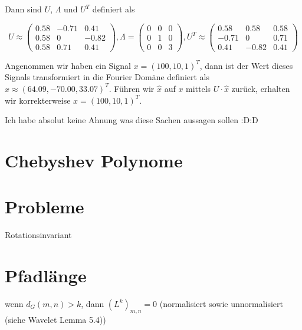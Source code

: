 Dann sind $U$, $\Lambda$ und $U^T$ definiert als

\begin{equation}
  U \approx \begin{pmatrix}
    0.58 & -0.71 & 0.41\\
    0.58 & 0 & -0.82\\
    0.58 & 0.71 & 0.41
  \end{pmatrix},
  \Lambda = \begin{pmatrix}
    0 & 0 & 0\\
    0 & 1 & 0\\
    0 & 0 & 3
  \end{pmatrix},
  U^T \approx \begin{pmatrix}
    0.58 & 0.58 & 0.58\\
    -0.71 & 0 & 0.71\\
    0.41 & -0.82 & 0.41
  \end{pmatrix}
\end{equation}

Angenommen wir haben ein Signal $x = {(100, 10, 1)}^T$, dann ist der Wert dieses Signals transformiert in die Fourier Domäne definiert als $\hat x \approx {(64.09, -70.00, 33.07)}^T$.
Führen wir $\hat x$ auf $x$ mittels $U \cdot \hat x$ zurück, erhalten wir korrekterweise $x = {(100, 10, 1)}^T$.

Ich habe absolut keine Ahnung was diese Sachen aussagen sollen :D:D

\section{Chebyshev Polynome}

\section{Probleme}

Rotationsinvariant

\section{Pfadlänge}

wenn $d_G(m,n) > k$, dann ${(L^k)}_{m, n} = 0$
(normalisiert sowie unnormalisiert (siehe Wavelet Lemma 5.4))
